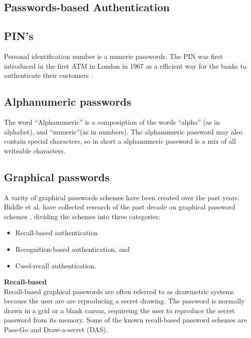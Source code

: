     \subsection{Passwords-based Authentication}

      \subsection*{PIN's}
        Personal identification number is a numeric passwords. The PIN was first introduced in the first ATM in London in 1967 as a efficient way for the banks to authenticate their customers \cite{Bonneau1}.      

      \subsection*{Alphanumeric passwords}

        The word ``Alphanumeric'' is a composiption of the words ``alpha'' (as in alphabet), and ``numeric''(as in numbers). The alphanumeric password may also contain special characters, so in short a alphanumeric password is a mix of all writeable characters.

      \subsection*{Graphical passwords}

      A varity of graphical passwords schemes have been created over the past years. Biddle et al. have collected research of the past decade on graphical password schemes \cite{Biddle}, dividing the schemes into three categories: 

      \begin{itemize}
        \item Recall-based authentication
        \item Recognition-based authentication, and 
        \item Cued-recall authentication.
      \end{itemize}

      {\bf Recall-based} \\
      
      Recall-based graphical passwords are often referred to as drawmetric systems \cite{DeAngeli} because the user are are reproducing a secret drawing. The password is normally drawn in a grid or a blank canvas, requireing the user to reproduce the secret password from its memory. Some of the known recall-based password schemes are Pass-Go and Draw-a-secret (DAS).


